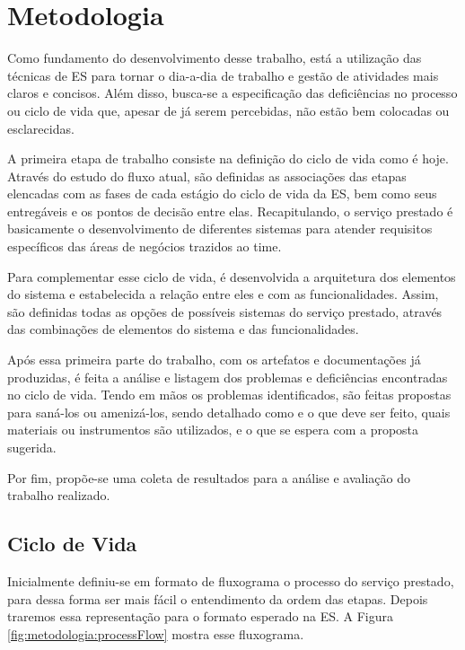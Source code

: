
\chapter{Metodologia}\label{chap:metodologia}

Como fundamento do desenvolvimento desse trabalho, está a utilização das técnicas de ES para tornar o dia-a-dia de trabalho e gestão de atividades mais claros e concisos. Além disso, busca-se a especificação das deficiências no processo ou ciclo de vida que, apesar de já serem percebidas, não estão bem colocadas ou esclarecidas.

A primeira etapa de trabalho consiste na definição do ciclo de vida como é hoje. Através do estudo do fluxo atual, são definidas as associações das etapas elencadas com as fases de cada estágio do ciclo de vida da ES, bem como seus entregáveis e os pontos de decisão entre elas. Recapitulando, o serviço prestado é basicamente o desenvolvimento de diferentes sistemas para atender requisitos específicos das áreas de negócios trazidos ao time.

Para complementar esse ciclo de vida, é desenvolvida a arquitetura dos elementos do sistema e estabelecida a relação entre eles e com as funcionalidades. Assim, são definidas todas as opções de possíveis sistemas do serviço prestado, através das combinações de elementos do sistema e das funcionalidades.

Após essa primeira parte do trabalho, com os artefatos e documentações já produzidas, é feita a análise e listagem dos problemas e deficiências encontradas no ciclo de vida. Tendo em mãos os problemas identificados, são feitas propostas para saná-los ou amenizá-los, sendo detalhado como e o que deve ser feito, quais materiais ou instrumentos são utilizados, e o que se espera com a proposta sugerida.

Por fim, propõe-se uma coleta de resultados para a análise e avaliação do trabalho realizado.

	\section{Ciclo de Vida}

	Inicialmente definiu-se em formato de fluxograma o processo do serviço prestado, para dessa forma ser 
	mais fácil o entendimento da ordem das etapas. Depois traremos essa representação para o formato esperado
	na ES. A Figura \ref{fig:metodologia:processFlow} mostra esse fluxograma.
	
